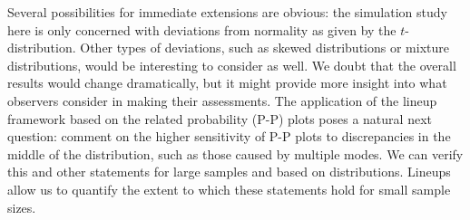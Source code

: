 \documentclass[12pt]{article}\usepackage[]{graphicx}\usepackage[]{color}
\begin{document}
Several possibilities for immediate extensions are obvious: the simulation study here is only concerned with deviations from normality as given by the $t$-distribution. Other types of deviations, such as skewed distributions or mixture distributions, would be interesting to consider as well. We doubt that the overall results would change dramatically, but it might provide more insight into what observers consider in making their assessments. 
The application of the lineup framework based on the related probability (P-P) plots poses a natural next question: \citet{koehler91} comment on the higher sensitivity of  P-P plots  to discrepancies in the middle of the distribution, such as those caused by multiple modes. We can verify this and other statements for large samples and based on distributions. Lineups allow us to quantify the extent to which these statements hold for small sample sizes.




\end{document}
